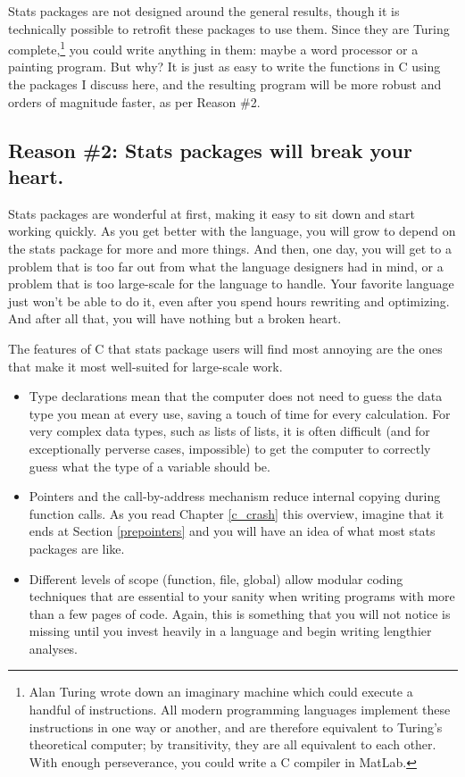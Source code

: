 {Stats packages are not designed around the general results, though
it is technically possible to retrofit these packages to use them. Since
they are Turing complete,\footnote{Alan Turing wrote down an imaginary
machine which could execute a handful of instructions.  All
modern programming languages implement these instructions in one way or
another, and are therefore equivalent to Turing's theoretical computer;
by transitivity, they are all equivalent to each other. With enough
perseverance, you could write a C compiler in MatLab.} you could
write anything in them: maybe a word processor or a painting program. But
why? It is just as easy to write the functions in C using the packages I discuss
here, and the resulting program will be more robust and orders of
magnitude faster, as per Reason \#2.
	\fi

\subsection{Reason \#2: Stats packages will break your heart.} Stats packages
are wonderful at first, making it easy to sit down and start working
quickly. As you get better with the language, you will 
grow to depend on the stats package for more and more
things. And then, one day, you will get to a problem that is too far
out from what the language designers had in mind, or a problem that is
too large-scale for the language to handle. Your favorite language just
won't be able to do it, even after you spend hours rewriting and
optimizing.  And after all that, you will have nothing but a broken heart.

The features of C that stats package users will find most annoying are
the ones that make it most well-suited for large-scale work. 
\begin{itemize}
\item Type declarations mean that the computer does not need to guess
the data type you mean at every use, saving a touch of time for every
calculation. For very complex data types,
such as lists of lists, it is often difficult (and for exceptionally
perverse cases, impossible) to get the computer to correctly guess what the
type of a variable should be.
\item Pointers and the call-by-address mechanism reduce internal copying
during function calls.  As you read \ifbook Chapter \ref{c_crash}\else
this overview\fi, imagine that it ends at Section \ref{prepointers}
and you will have an idea of what most stats packages are like.
\item Different levels of scope (function, file, global) allow modular
coding techniques that are essential
to your sanity when writing programs with more than a few pages of
code. Again, this is something that you will not notice is missing until
you invest heavily in a language and begin writing lengthier analyses.
\end{itemize}

}
